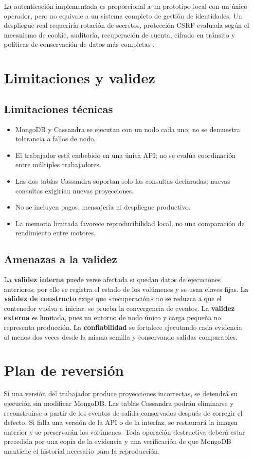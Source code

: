 La autenticación implementada es proporcional a un prototipo local con un único operador, pero no equivale a un sistema completo de gestión de identidades. Un despliegue real requeriría rotación de secretos, protección CSRF evaluada según el mecanismo de cookie, auditoría, recuperación de cuenta, cifrado en tránsito y políticas de conservación de datos más completas \parencite{owaspASVS}.

\section{Limitaciones y validez}

\subsection{Limitaciones técnicas}

\begin{itemize}
  \item MongoDB y Cassandra se ejecutan con un nodo cada uno; no se demuestra tolerancia a fallos de nodo.
  \item El trabajador está embebido en una única API; no se evalúa coordinación entre múltiples trabajadores.
  \item Las dos tablas Cassandra soportan solo las consultas declaradas; nuevas consultas exigirían nuevas proyecciones.
  \item No se incluyen pagos, mensajería ni despliegue productivo.
  \item La memoria limitada favorece reproducibilidad local, no una comparación de rendimiento entre motores.
\end{itemize}

\subsection{Amenazas a la validez}

La \textbf{validez interna} puede verse afectada si quedan datos de ejecuciones anteriores; por ello se registra el estado de los volúmenes y se usan claves fijas. La \textbf{validez de constructo} exige que «recuperación» no se reduzca a que el contenedor vuelva a iniciar: se prueba la convergencia de eventos. La \textbf{validez externa} es limitada, pues un entorno de nodo único y carga pequeña no representa producción. La \textbf{confiabilidad} se fortalece ejecutando cada evidencia al menos dos veces desde la misma semilla y conservando salidas comparables.

\section{Plan de reversión}

Si una versión del trabajador produce proyecciones incorrectas, se detendrá su ejecución sin modificar MongoDB. Las tablas Cassandra podrán eliminarse y reconstruirse a partir de los eventos de salida conservados después de corregir el defecto. Si falla una versión de la API o de la interfaz, se restaurará la imagen anterior y se preservarán los volúmenes. Toda operación destructiva deberá estar precedida por una copia de la evidencia y una verificación de que MongoDB mantiene el historial necesario para la reproducción.
